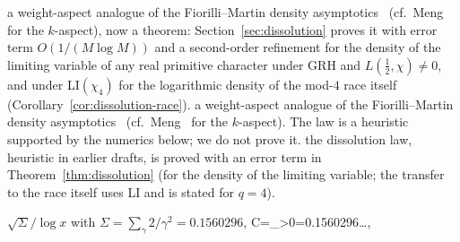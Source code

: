%
a weight-aspect analogue of the Fiorilli--Martin density
asymptotics~\cite{FM13} (cf.\ Meng~\cite{Meng18} for the $k$-aspect),
now a theorem: Section~\ref{sec:dissolution} proves it with error term
$O(1/(M\log M))$ and a second-order refinement for the density of the
limiting variable of any real primitive character under GRH and
$L(\tfrac12,\chi)\ne0$, and under LI$(\chi_4)$ for the logarithmic
density of the mod-$4$ race itself
(Corollary~\ref{cor:dissolution-race}).
%
a weight-aspect analogue of the Fiorilli--Martin density
asymptotics~\cite{FM13} (cf.\ Meng~\cite{Meng18} for the $k$-aspect).
The law is a heuristic supported by the numerics below; we do not
prove it.
%
%
the dissolution law, heuristic in earlier drafts, is proved with an
error term in Theorem~\ref{thm:dissolution} (for the density of the
limiting variable; the transfer to the race itself uses LI and is
stated for $q=4$).
%


$\sqrt{\Sigma}/\log x$ with $\Sigma=\sum_\gamma2/\gamma^2=0.1560296$,
%
C=\sum_{\gamma>0}=0.1560296\ldots,


